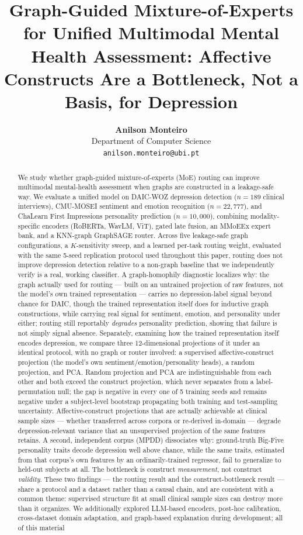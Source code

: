 \documentclass[twocolumn]{article}
\title{Graph-Guided Mixture-of-Experts for Unified Multimodal Mental Health Assessment: Affective Constructs Are a Bottleneck, Not a Basis, for Depression}
\author{
    \textbf{Anilson Monteiro}\\
    Department of Computer Science\\
    \texttt{anilson.monteiro@ubi.pt}
}
\begin{document}
\maketitle

\begin{abstract}
    We study whether graph-guided mixture-of-experts (MoE) routing can improve multimodal mental-health assessment when graphs are constructed in a leakage-safe way. We evaluate a unified model on DAIC-WOZ depression detection ($n=189$ clinical interviews), CMU-MOSEI sentiment and emotion recognition ($n=22{,}777$), and ChaLearn First Impressions personality prediction ($n=10{,}000$), combining modality-specific encoders (RoBERTa, WavLM, ViT), gated late fusion, an MMoEEx expert bank, and a KNN-graph GraphSAGE router. Across five leakage-safe graph configurations, a $K$-sensitivity sweep, and a learned per-task routing weight, evaluated with the same 5-seed replication protocol used throughout this paper, routing does not improve depression detection relative to a non-graph baseline that we independently verify is a real, working classifier. A graph-homophily diagnostic localizes why: the graph actually used for routing — built on an untrained projection of raw features, not the model's own trained representation — carries no depression-label signal beyond chance for DAIC, though the trained representation itself does for inductive graph constructions, while carrying real signal for sentiment, emotion, and personality under either; routing still reportably \emph{degrades} personality prediction, showing that failure is not simply signal absence. Separately, examining how the trained representation itself encodes depression, we compare three 12-dimensional projections of it under an identical protocol, with no graph or router involved: a supervised affective-construct projection (the model's own sentiment/emotion/personality heads), a random projection, and PCA. Random projection and PCA are indistinguishable from each other and both exceed the construct projection, which never separates from a label-permutation null; the gap is negative in every one of 5 training seeds and remains negative under a subject-level bootstrap propagating both training and test-sampling uncertainty. Affective-construct projections that are actually achievable at clinical sample sizes — whether transferred across corpora or re-derived in-domain — degrade depression-relevant variance that an unsupervised projection of the same features retains. A second, independent corpus (MPDD) dissociates why: ground-truth Big-Five personality traits decode depression well above chance, while the same traits, estimated from that corpus's own features by an ordinarily-trained regressor, fail to generalize to held-out subjects at all. The bottleneck is construct \emph{measurement}, not construct \emph{validity}. These two findings — the routing result and the construct-bottleneck result — share a protocol and a dataset rather than a causal chain, and are consistent with a common theme: supervised structure fit at small clinical sample sizes can destroy more than it organizes. We additionally explored LLM-based encoders, post-hoc calibration, cross-dataset domain adaptation, and graph-based explanation during development; all of this material 
\end{abstract}
\end{document}
